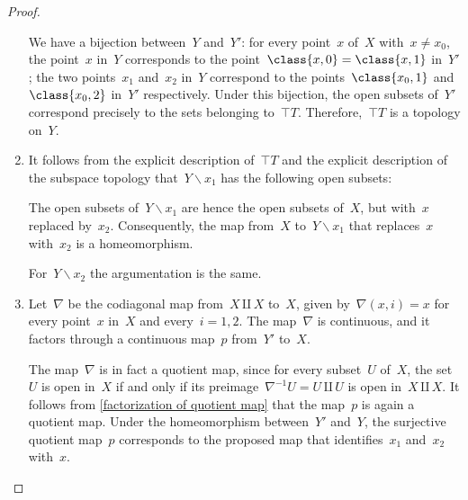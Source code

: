 \begin{proof}
\begin{enumerate}
\begin{itemize*}
			\end{itemize*}

			We have a bijection between~$Y$ and~$Y'$:
			for every point~$x$ of~$X$ with~$x ≠ x_0$, the point~$x$ in~$Y$ corresponds to the point~$\class{x, 0} = \class{x, 1}$ in~$Y'$;
			the two points~$x_1$ and~$x_2$ in~$Y$ correspond to the points~$\class{x_0, 1}$ and~$\class{x_0, 2}$ in~$Y'$ respectively.
			Under this bijection, the open subsets of~$Y'$ correspond precisely to the sets belonging to~$\top{T}$.
			Therefore,~$\top{T}$ is a topology on~$Y$.

		\item
			It follows from the explicit description of~$\top{T}$ and the explicit description of the subspace topology that~$Y ∖ x_1$ has the following open subsets:
			The open subsets of~$Y ∖ x_1$ are hence the open subsets of~$X$, but with~$x$ replaced by~$x_2$.
			Consequently, the map from~$X$ to~$Y ∖ x_1$ that replaces~$x$ with~$x_2$ is a homeomorphism.

			For~$Y ∖ x_2$ the argumentation is the same.

		\item
			Let~$∇$ be the codiagonal map from~$X ⨿ X$ to~$X$, given by~$∇ (x, i) = x$ for every point~$x$ in~$X$ and every~$i = 1, 2$.
			The map~$∇$ is continuous, and it factors through a continuous map~$p$ from~$Y'$ to~$X$.

			The map~$∇$ is in fact a quotient map, since for every subset~$U$ of~$X$, the set~$U$ is open in~$X$ if and only if its preimage~$∇^{-1} U = U ⨿ U$ is open in~$X ⨿ X$.
			It follows from \cref{factorization of quotient map} that the map~$p$ is again a quotient map.
			Under the homeomorphism between~$Y'$ and~$Y$, the surjective quotient map~$p$ corresponds to the proposed map that identifies~$x_1$ and~$x_2$ with~$x$.
		\qedhere

	\end{enumerate}
\end{proof}

